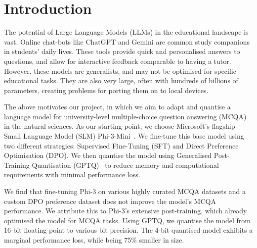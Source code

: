 \section{Introduction}
\label{sec:intro}


The potential of Large Language Models (LLMs) in the educational
landscape is vast. Online chat-bots like ChatGPT and
Gemini are common study companions in students' daily lives.
These tools provide quick and personalised answers to questions, and allow for
interactive feedback comparable to having a tutor. However, these models are generalists, 
and may not be optimised for specific educational tasks. They are also very large, often with 
hundreds of billions of parameters, creating problems for porting them on 
to local devices. 


The above motivates our project, in which we aim to adapt and quantise a
language model for university-level multiple-choice question answering (MCQA) in the
natural sciences. As our starting point, we choose Microsoft's flagship
Small Language Model (SLM) Phi-3-Mini~\cite{phi3}. We fine-tune this base model
using two different strategies: Supervised Fine-Tuning
(SFT) and Direct Preference Optimisation (DPO). We then quantise the model using Generalised Post-Training Quantisation
(GPTQ)~\cite{gptq} to reduce memory and computational requirements with minimal performance loss.

We find that fine-tuning Phi-3 on various highly curated MCQA
datasets and a custom DPO preference dataset does not improve the model's MCQA
performance. We attribute this to Phi-3's extensive post-training,
which already optimised the model for MCQA tasks. Using GPTQ, we quantise the
model from 16-bit floating point to various bit precision. The 4-bit quantised model exhibits a marginal performance loss, while being 75\%
smaller in size.


% 
